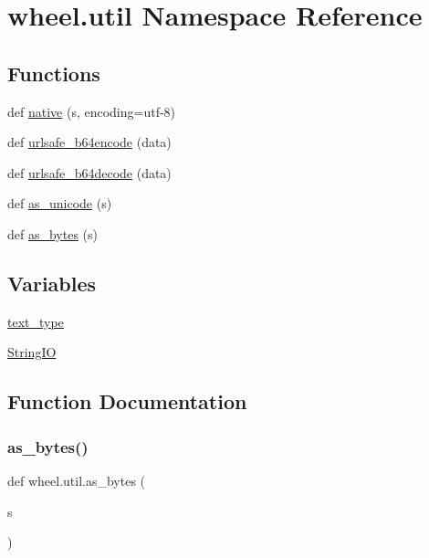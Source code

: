 \hypertarget{namespacewheel_1_1util}{}\section{wheel.\+util Namespace Reference}
\label{namespacewheel_1_1util}
\subsection*{Functions}
\begin{DoxyCompactItemize}
\item 
def \hyperlink{namespacewheel_1_1util_a3beb4a7a5151092fc1ddcd51db419a63}{native} (s, encoding=\textquotesingle{}utf-\/8\textquotesingle{})
\item 
def \hyperlink{namespacewheel_1_1util_aaabe3fbd49c6945f3985ca386831b715}{urlsafe\+\_\+b64encode} (data)
\item 
def \hyperlink{namespacewheel_1_1util_a3289fdd625c0570dc25d16f49d885282}{urlsafe\+\_\+b64decode} (data)
\item 
def \hyperlink{namespacewheel_1_1util_a2e10809961179cc9a8bd54fda0da1fe3}{as\+\_\+unicode} (s)
\item 
def \hyperlink{namespacewheel_1_1util_ac69d3041de85d4daa62517a9fdb21d43}{as\+\_\+bytes} (s)
\end{DoxyCompactItemize}
\subsection*{Variables}
\begin{DoxyCompactItemize}
\item 
\hyperlink{namespacewheel_1_1util_a48320c7630d85d2d1d4b12d6b08c3e9a}{text\+\_\+type}
\item 
\hyperlink{namespacewheel_1_1util_a3da83464d837e18181c5f2bd31bb9b17}{String\+IO}
\end{DoxyCompactItemize}


\subsection{Function Documentation}
\mbox{\label{namespacewheel_1_1util_ac69d3041de85d4daa62517a9fdb21d43}} 
\subsubsection{\texorpdfstring{as\+\_\+bytes()}{as\_bytes()}}
{\footnotesize\ttfamily def wheel.\+util.\+as\+\_\+bytes (\begin{DoxyParamCaption}\item[{}]{s }\end{DoxyParamCaption})}

